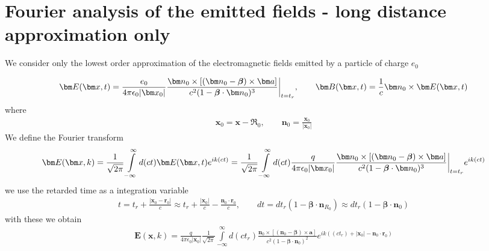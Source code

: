 

\section{Fourier analysis of the emitted fields - long distance approximation only}

We consider only the lowest order approximation of the electromagnetic fields emitted by a particle of charge $e_0$

\begin{align}
  {\bm E}({\bm x},t)={\frac{e_0}{4\pi\epsilon_0|{\bm x}_0|}\frac{{\bm n}_{0}\times[({\bm n}_{0}-{\boldsymbol\beta})\times {\bm a}]}{c^2(1-{\boldsymbol\beta}\cdot{\bm n}_{0})^3}\,\vline}_{\,t=t_r},\qquad {\bm B}({\bm x},t) = \frac1c{\bm n}_0\times{\bm E}({\bm x},t)
\end{align}
where
\begin{align}
  {\bm x}_0={\bm x}-{\boldsymbol{\mathfrak{R}}}_0,\qquad {\bm n}_0=\frac{{\bm x}_0}{|{\bm x}_0|}
\end{align}
We define the Fourier transform
\begin{align}
  {\bm E}({\bm x},k) = \frac1{\sqrt{2\pi}}\int\limits_{-\infty}^{\infty} d (ct) {\bm E}({\bm x},t)e^{ik  (ct)}=\frac1{\sqrt{2\pi}}\int\limits_{-\infty}^{\infty} d (ct) {\frac{q}{4\pi\epsilon_0|{\bm x}_0|}\frac{{\bm n}_{0}\times[({\bm n}_{0}-{\boldsymbol\beta})\times {\bm a}]}{c^2(1-{\boldsymbol\beta}\cdot{\bm n}_{0})^3}\,\vline}_{\,t=t_r}e^{ik(ct)}
\end{align}
we use the retarded time as a integration variable
\begin{align}
  t=t_r+\frac{|{\bm x}_0-{\bm r}_0|}c\approx t_r+\frac{|{\bm x}_0|}c-\frac{{\bm n}_0\cdot{\bm r}_0}c,\qquad dt=dt_r(1-{\boldsymbol{\beta}}\cdot{\bm n}_{R_0})\approx dt_r(1-{\boldsymbol{\beta}}\cdot{\bm n}_0)
\end{align}
with these we obtain
\begin{align}
  {\bm E}({\bm x},k) = \frac{q}{4\pi\epsilon_0|{\bm x}_0|}\frac1{\sqrt{2\pi}}\int\limits_{-\infty}^{\infty}d(ct_r) \frac{{\bm n}_{0}\times[({\bm n}_{0}-{\boldsymbol\beta})\times {\bm a}]}{c^2(1-{\boldsymbol\beta}\cdot{\bm n}_{0})^2}e^{ik((ct_r)+|{\bm x}_0|-{\bm n}_0\cdot{\bm r}_0)}
\end{align}

